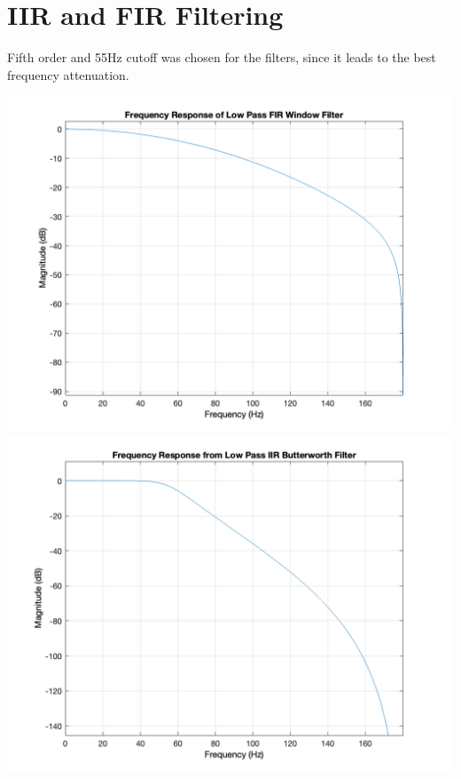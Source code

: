 \documentclass[11pt,oneside]{book}
\begin{document}
\chapter{IIR and FIR Filtering}
Fifth order and 55Hz cutoff was chosen for the filters, since it leads to the best frequency attenuation.
\begin{center}
    \includegraphics[width=14cm]{graphics/fir_o5.png}
    \includegraphics[width=14cm]{graphics/iir_o5.png}
    
\end{center}
\end{document}
